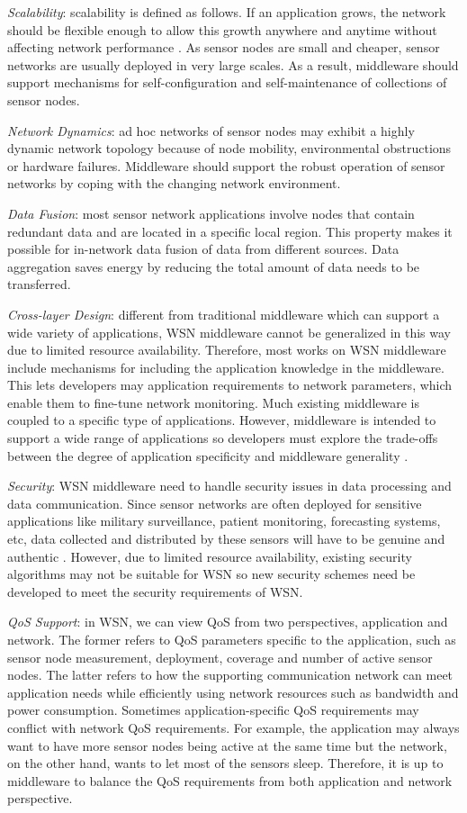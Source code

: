 \emph{Scalability}: scalability is defined as follows. If an application grows, the network should be flexible enough to allow this growth anywhere and anytime without affecting network performance \cite{middlewarechallenge}. As sensor nodes are small and cheaper, sensor networks are usually deployed in very large scales. As a result, middleware should support mechanisms for self-configuration and self-maintenance of collections of sensor nodes. 

\emph{Network Dynamics}: ad hoc networks of sensor nodes may exhibit a highly dynamic network topology because of node mobility, environmental obstructions or hardware failures. Middleware should support the robust operation of sensor networks by coping with the changing network environment. 

\emph{Data Fusion}: most sensor network applications involve nodes that contain redundant data and are located in a specific local region. This property makes it possible for in-network data fusion of data from different sources. Data aggregation saves energy by reducing the total amount of data needs to be transferred.

\emph{Cross-layer Design}: different from traditional middleware which can support a wide variety of applications, WSN middleware cannot be generalized in this way due to limited resource availability. Therefore, most works on WSN middleware include mechanisms for including the application knowledge in the middleware. This lets developers may application requirements to network parameters, which enable them to fine-tune network monitoring. Much existing middleware is coupled to a specific type of applications. However, middleware is intended to support a wide range of applications so developers must explore the trade-offs between the degree of application specificity and middleware generality \cite{middlewarechallenge}.

\emph{Security}: WSN middleware need to handle security issues in data processing and data communication. Since sensor networks are often deployed for sensitive applications like military surveillance, patient monitoring, forecasting systems, etc, data collected and distributed by these sensors will have to be genuine and authentic \cite{middlewaresurvey1}. However, due to limited resource availability, existing security algorithms may not be suitable for WSN so new security schemes need be developed to meet the security requirements of WSN.

\emph{QoS Support}: in WSN, we can view QoS from two perspectives, application and network. The former refers to QoS parameters specific to the application, such as sensor node measurement, deployment, coverage and number of active sensor nodes. The latter refers to how the supporting communication network can meet application needs while efficiently using network resources such as bandwidth and power consumption. Sometimes application-specific QoS requirements may conflict with network QoS requirements. For example, the application may always want to have more sensor nodes being active at the same time but the network, on the other hand, wants to let most of the sensors sleep. Therefore, it is up to middleware to balance the QoS requirements from both application and network perspective.

